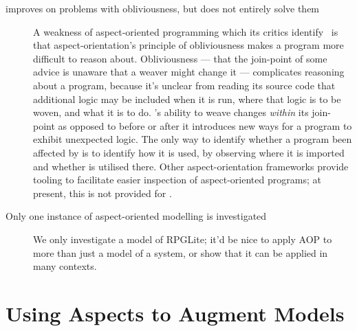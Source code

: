 \begin{description}

  \item[\pdsf{} improves on problems with obliviousness, but does not entirely
    solve them]
    A weakness of aspect-oriented
    programming which its critics
    identify~\cite{steimann06paradoxical,Constantinides04aopconsidered,przybylek2010wrong}
    is that aspect-orientation's principle of obliviousness makes a program more
    difficult to reason about. Obliviousness --- that the join-point of some
    advice is unaware that a weaver might change it --- complicates reasoning
    about a program, because it's unclear from reading its source code that
    additional logic may be included when it is run, where that logic is to be
    woven, and what it is to do. \pdsf{}'s ability to weave changes
    \emph{within} its join-point as opposed to before or after it introduces new
    ways for a program to exhibit unexpected logic. The only way to identify
    whether a program been affected by \pdsf{} is to identify how it is used, by
    observing where it is imported and whether \pdsf{} is utilised there. Other
    aspect-orientation frameworks provide tooling to facilitate easier
    inspection of aspect-oriented programs; at present, this is not provided for
    \pdsf{}.
  \item[Only one instance of aspect-oriented modelling is investigated]
     We only investigate a model of RPGLite;
    it'd be nice to apply AOP to more than just a model of a \sociotechnical
    system, or show that it can be applied in many contexts.
\end{description}





\section{Using Aspects to Augment Models}


